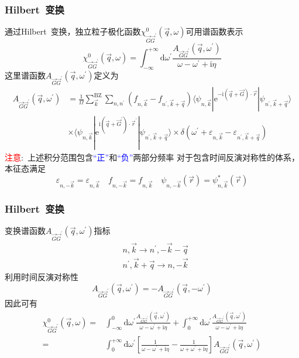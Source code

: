 \documentclass[cjk,slidestop,compress,mathserif,blue]{beamer}
\begin{document}
\frame
{
	\frametitle{\textrm{Hilbert~}变换}
	通过\textrm{Hilbert~}变换，独立粒子极化函数$\chi_{\vec G\vec G^{\prime}}^0(\vec q,\omega)$可用谱函数表示
	\begin{displaymath}
		\chi_{\vec G\vec G^{\prime}}^0(\vec q,\omega)=\int_{-\infty}^{+\infty}\mathrm{d}\omega^{\prime}\frac{A_{\vec G\vec G^{\prime}}(\vec q,\omega^{\prime})}{\omega-\omega^{\prime}+\mathrm{i}\eta}
	\end{displaymath}
	这里谱函数$A_{\vec G\vec G^{\prime}}(\vec q,\omega^{\prime})$定义为
	\begin{displaymath}
		\begin{aligned}
			A_{\vec G\vec G^{\prime}}(\vec q,\omega^{\prime})&=\frac1{\Omega}\sum_{\vec k}^{\mathrm{BZ}}\sum_{n,n^{\prime}}(f_{n,\vec k}-f_{n^{\prime},\vec k+\vec q})\langle\psi_{n,\vec k}|\mathrm{e}^{-\mathrm{i}(\vec q+\vec G)\cdot\vec r}|\psi_{n^{\prime},\vec k+\vec q}\rangle\\
			&\times\langle\psi_{n,\vec k}|\mathrm{e}^{\mathrm{i}(\vec q+\vec G^{\prime})\cdot\vec r^{\prime}}|\psi_{n^{\prime},\vec k+\vec q}\rangle\times\delta(\omega^{\prime}+\varepsilon_{n,\vec k}-\varepsilon_{n^{\prime},\vec k+\vec q})
		\end{aligned}
	\end{displaymath}
	\textcolor{red}{注意}:~上述积分范围包含\textcolor{blue}{“正”}和\textcolor{blue}{“负”}两部分频率
	\vskip 5pt
	对于包含时间反演对称性的体系，本征态满足
	\begin{displaymath}
		\varepsilon_{n,-\vec k}=\varepsilon_{n,\vec k}\quad f_{n,-\vec k}=f_{n,\vec k}\quad\psi_{n,-\vec k}(\vec r)=\psi_{n,\vec k}^{\ast}(\vec r)
	\end{displaymath}
}

\frame
{
	\frametitle{\textrm{Hilbert~}变换}
	变换谱函数$A_{\vec G\vec G^{\prime}}(\vec q,\omega^{\prime})$指标
	\begin{displaymath}
		\begin{aligned}
			&n,\vec k\rightarrow n^{\prime},-\vec k-\vec q\\
			&n^{\prime},\vec k+\vec q\rightarrow n,-\vec k
		\end{aligned}
	\end{displaymath}
	利用时间反演对称性
	\begin{displaymath}
		A_{\vec G\vec G^{\prime}}(\vec q,\omega^{\prime})=-A_{\vec G\vec G^{\prime}}(\vec q,-\omega^{\prime})
	\end{displaymath}
	因此可有
	\begin{displaymath}
		\begin{aligned}
			\chi_{\vec G\vec G^{\prime}}^0(\vec q,\omega)=&\int_{-\infty}^0\mathrm{d}\omega^{\prime}\frac{A_{\vec G\vec G^{\prime}}(\vec q,\omega^{\prime})}{\omega-\omega^{\prime}+\mathrm{i}\eta}+\int_0^{+\infty}\mathrm{d}\omega^{\prime}\frac{A_{\vec G\vec G^{\prime}}(\vec q,\omega^{\prime})}{\omega-\omega^{\prime}+\mathrm{i}\eta}\\
			=&\int_0^{+\infty}\mathrm{d}\omega^{\prime}\left[ \frac1{\omega-\omega^{\prime}+\mathrm{i}\eta}-\frac1{\omega+\omega^{\prime}+\mathrm{i}\eta} \right]A_{\vec G\vec G^{\prime}}(\vec q,\omega^{\prime})
		\end{aligned}
	\end{displaymath}
}
\end{document}
